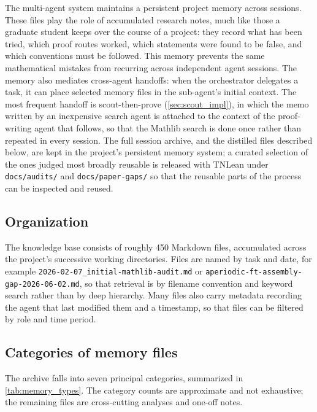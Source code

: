 The multi-agent system maintains a persistent project memory across sessions.
These files play the role of accumulated research notes, much like those a graduate student keeps over the course of a project: they record what has been tried, which proof routes worked, which statements were found to be false, and which conventions must be followed. This memory prevents the same mathematical mistakes from recurring across independent agent sessions.
The memory also mediates cross-agent handoffs: when the orchestrator delegates a task, it can place selected memory files in the sub-agent's initial context. The most frequent handoff is scout-then-prove (\cref{sec:scout_impl}), in which the memo written by an inexpensive search agent is attached to the context of the proof-writing agent that follows, so that the Mathlib search is done once rather than repeated in every session.
The full session archive, and the distilled files described below, are kept in the project's persistent memory system; a curated selection of the ones judged most broadly reusable is released with TNLean under \texttt{docs/audits/} and \texttt{docs/paper-gaps/} so that the reusable parts of the process can be inspected and reused.

\subsection{Organization}\label{sec:mem_arch}


The knowledge base consists of roughly 450 Markdown files, accumulated across the project's successive working directories. Files are named by task and date, for example \texttt{2026-02-07\_initial-mathlib-audit.md} or \texttt{aperiodic-ft-assembly-gap-2026-06-02.md}, so that retrieval is by filename convention and keyword search rather than by deep hierarchy. Many files also carry metadata recording the agent that last modified them and a timestamp, so that files can be filtered by role and time period.

\subsection{Categories of memory files}

The archive falls into seven principal categories, summarized in \cref{tab:memory_types}. The category counts are approximate and not exhaustive; the remaining files are cross-cutting analyses and one-off notes.

